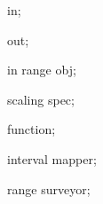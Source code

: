 \newif\ifpgf@dvignore

{

  \attribute in;

  \attribute out;

  \attribute in range obj;
  
  \attribute scaling spec;

  \attribute function;
  
  \attribute interval mapper;
  
  \attribute range surveyor;
  
}
